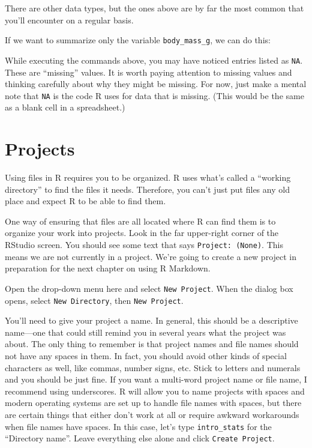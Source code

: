 \documentclass[
]{book}
\newenvironment{Shaded}{\begin{snugshade}}{\end{snugshade}}
\newcommand{\FunctionTok}[1]{\textcolor[rgb]{0.00,0.00,0.00}{#1}}
\newcommand{\NormalTok}[1]{#1}
\newcommand{\SpecialCharTok}[1]{\textcolor[rgb]{0.00,0.00,0.00}{#1}}
\begin{document}
There are other data types, but the ones above are by far the most common that you'll encounter on a regular basis.

If we want to summarize only the variable \texttt{body\_mass\_g}, we can do this:

\begin{Shaded}
\end{Shaded}

While executing the commands above, you may have noticed entries listed as \texttt{NA}. These are ``missing'' values. It is worth paying attention to missing values and thinking carefully about why they might be missing. For now, just make a mental note that \texttt{NA} is the code R uses for data that is missing. (This would be the same as a blank cell in a spreadsheet.)

\hypertarget{intror-projects}{%
\section{Projects}\label{intror-projects}}

Using files in R requires you to be organized. R uses what's called a ``working directory'' to find the files it needs. Therefore, you can't just put files any old place and expect R to be able to find them.

One way of ensuring that files are all located where R can find them is to organize your work into projects. Look in the far upper-right corner of the RStudio screen. You should see some text that says \texttt{Project:\ (None)}. This means we are not currently in a project. We're going to create a new project in preparation for the next chapter on using R Markdown.

Open the drop-down menu here and select \texttt{New\ Project}. When the dialog box opens, select \texttt{New\ Directory}, then \texttt{New\ Project}.

You'll need to give your project a name. In general, this should be a descriptive name---one that could still remind you in several years what the project was about. The only thing to remember is that project names and file names should not have any spaces in them. In fact, you should avoid other kinds of special characters as well, like commas, number signs, etc. Stick to letters and numerals and you should be just fine. If you want a multi-word project name or file name, I recommend using underscores. R will allow you to name projects with spaces and modern operating systems are set up to handle file names with spaces, but there are certain things that either don't work at all or require awkward workarounds when file names have spaces. In this case, let's type \texttt{intro\_stats} for the ``Directory name''. Leave everything else alone and click \texttt{Create\ Project}.
\end{document}
